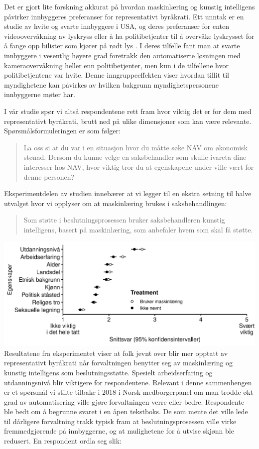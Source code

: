 \documentclass[
]{book}
\begin{document}
Det er gjort lite forskning akkurat på hvordan maskinlæring og kunstig intelligens påvirker innbyggeres preferanser for representativt byråkrati.
Ett unntak er en studie av hvite og svarte innbyggere i USA, og deres preferanser for enten videoovervåkning av lyskryss eller å ha politibetjenter til å overvåke lyskrysset for å fange opp bilister som kjører på rødt lys \citep{miller2021representative}.
I deres tilfelle fant man at svarte innbyggere i vesentlig høyere grad foretrakk den automatiserte løsningen med kameraovervåkning heller enn politibetjenter, men kun i de tilfellene hvor politibetjentene var hvite.
Denne inngruppeeffekten viser hvordan tillit til myndighetene kan påvirkes av hvilken bakgrunn myndighetspersonene innbyggerne møter har.

I vår studie spør vi altså respondentene rett fram hvor viktig det er for dem med representativt byråkrati, brutt ned på ulike dimensjoner som kan være relevante.
Spørsmålsformuleringen er som følger:

\begin{quote}
La oss si at du var i en situasjon hvor du måtte søke NAV om økonomisk stønad. Dersom du kunne velge en saksbehandler som skulle ivareta dine interesser hos NAV, hvor viktig tror du at egenskapene under ville vært for denne personen?
\end{quote}

Eksperimentdelen av studien innebærer at vi legger til en ekstra setning til halve utvalget hvor vi opplyser om at maskinlæring brukes i saksbehandlingen:

\begin{quote}
Som støtte i beslutningsprosessen bruker saksbehandleren kunstig intelligens, basert på maskinlæring, som anbefaler hvem som skal få støtte.
\end{quote}

\includegraphics{figs/png/fig_exp_repr_each.png}
Resultatene fra eksperimentet viser at folk jevnt over blir mer opptatt av representativt byråkrati når forvaltningen benytter seg av maskinlæring og kunstig intelligens som beslutningsstøtte.
Spesielt arbeidserfaring og utdanningsnivå blir viktigere for respondentene.
Relevant i denne sammenhengen er et spørsmål vi stilte tilbake i 2018 i Norsk medborgerpanel om man trodde økt grad av automatisering ville gjøre forvaltningen verre eller bedre.
Respondente ble bedt om å begrunne svaret i en åpen tekstboks.
De som mente det ville lede til dårligere forvaltning trakk typisk fram at beslutningsprosessen ville virke fremmedgjørende på innbyggerne, og at mulighetene for å utvise skjønn ble redusert.
En respondent ordla seg slik:
\end{document}
